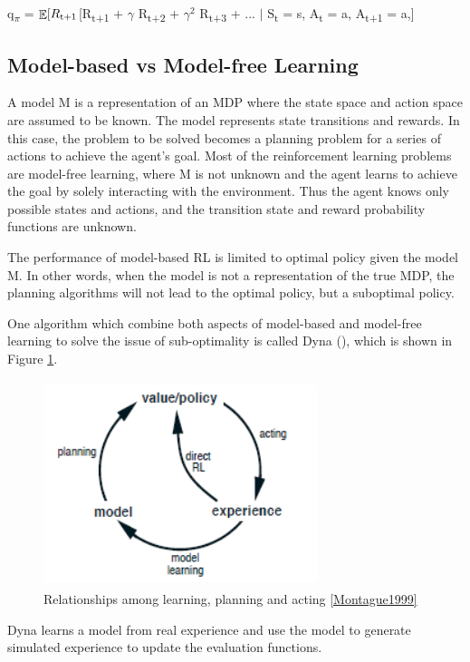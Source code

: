 \documentclass[12pt,twoside]{report}
\DeclareMathOperator{\E}{\mathbb{E}}
\begin{document}
q\textsubscript{$\pi$} = $\displaystyle \E[R\textsubscript{t+1} $[R\textsubscript{t+1} + $\gamma$ R\textsubscript{t+2} + $\gamma^2$ R\textsubscript{t+3} + ... $\vert$ S\textsubscript{t} = s, A\textsubscript{t} = a, A\textsubscript{t+1 } = a,]

\subsection{Model-based vs Model-free Learning}
\label{model_base_model_free_subsection}
A model M is a representation of an MDP where the state space and action space are assumed to be known. The model represents state transitions and rewards. In this case, the problem to be solved becomes a planning problem for a series of actions to achieve the agent's goal.
Most of the reinforcement learning problems are model-free learning, where M is not unknown and the agent learns to achieve the goal by solely interacting with the environment. Thus the agent knows only possible states and actions, and the transition state and reward probability functions are unknown.

The performance of model-based RL is limited to optimal policy given the model M. In other words, when the model is not a representation of the true MDP, the planning algorithms will not lead to the optimal policy, but a suboptimal policy.

One algorithm which combine both aspects of model-based and model-free learning to solve the issue of sub-optimality is called Dyna (\cite{Sutton1990}), which is shown in Figure \ref{dyna}.

\begin{figure}[!htb]
\centering
\includegraphics[width=8cm, height=6cm]{./figures/dyna}
\caption{Relationships among learning, planning and acting \ref{Montague1999}}
\label{dyna}
\end{figure}

Dyna learns a model from real experience and use the model to generate simulated experience to update the evaluation functions.
\end{document}
